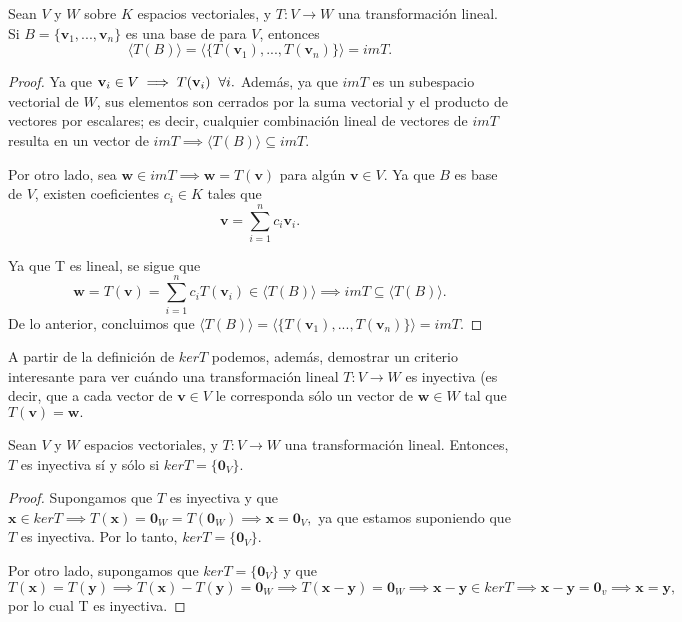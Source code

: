 \documentclass[12pt]{article}
\newenvironment{teorema}[2][Teorema]{\begin{trivlist}
\item[\hskip \labelsep {\bfseries #1}\hskip \labelsep {\bfseries #2.}]}{\end{trivlist}}
\begin{document}
\begin{teorema}{5.2.2}
    Sean $V$ y $W$ sobre $K$ espacios vectoriales, y $T:V\to W$ una transformación lineal. Si $B=\{\mathbf{v}_1,...,\mathbf{v}_n\}$ es una base de para $V$, entonces \[
        \langle T(B) \rangle = \langle \{T(\mathbf{v}_1),...,T(\mathbf{v}_n)\}\rangle = imT
    .\] 

\begin{proof}
    Ya que $\mathbf{v}_i\in V\implies T(\mathbf{v}_i)\hspace{2mm} \forall i.$ Además, ya que $imT$ es un subespacio vectorial de $W$, sus elementos son cerrados por la suma vectorial y el producto de vectores por escalares; es decir, cualquier combinación lineal de vectores de $imT$ resulta en un vector de $imT\implies \langle T(B)\rangle \subseteq imT.$

    Por otro lado, sea $\mathbf{w}\in imT\implies \mathbf{w}=T(\mathbf{v})$ para algún $\mathbf{v}\in V.$ Ya que $B$ es base de $V$, existen coeficientes $c_i\in K$ tales que  \[
        \mathbf{v}=\sum_{i=1}^n c_i\mathbf{v}_i
    .\] 

    \noindent Ya que T es lineal, se sigue que \[
        \mathbf{w} =T(\mathbf{v})=\sum_{i=1}^n c_iT(\mathbf{v}_i)\in \langle T(B) \rangle \implies imT \subseteq \langle T(B)\rangle
    .\] \noindent De lo anterior, concluimos que $\langle T(B) \rangle = \langle \{T(\mathbf{v}_1),...,T(\mathbf{v}_n)\}\rangle = imT.$

\end{proof}

\end{teorema}

A partir de la definición de $kerT$ podemos, además, demostrar un criterio interesante para ver cuándo una transformación lineal $T:V\to W$ es inyectiva (es decir, que a cada vector de $\mathbf{v}\in V$ le corresponda sólo un vector de $\mathbf{w}\in W$ tal que $T(\mathbf{v})=\mathbf{w}.$ 

\begin{teorema}{4.2.3}
    
    Sean $V$ y $W$ espacios vectoriales, y $T:V\to W$ una transformación lineal. Entonces, $T$ es inyectiva sí y sólo si $kerT=\{\mathbf{0}_V\}.$

    \begin{proof}
        Supongamos que $T$ es inyectiva y que $\mathbf{x}\in kerT\implies T(\mathbf{x})=\mathbf{0}_W=T(\mathbf{0}_W)\implies \mathbf{x}=\mathbf{0}_V,$ ya que estamos suponiendo que $T$ es inyectiva. Por lo tanto, $kerT=\{\mathbf{0}_V\}.$

        Por otro lado, supongamos que $kerT=\{\mathbf{0}_V\}$ y que $T(\mathbf{x})=T(\mathbf{y})\implies T(\mathbf{x})-T(\mathbf{y})=\mathbf{0}_W\implies T(\mathbf{x}-\mathbf{y})=\mathbf{0}_W\implies \mathbf{x}-\mathbf{y}\in kerT\implies \mathbf{x}-\mathbf{y}=\mathbf{0}_v\implies \mathbf{x}=\mathbf{y},$ por lo cual T es inyectiva.

    \end{proof}
\end{teorema}
\end{document}
